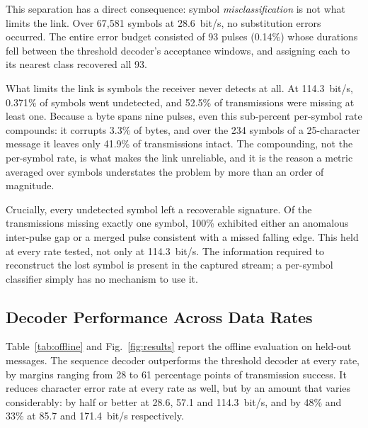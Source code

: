 This separation has a direct consequence: symbol \emph{misclassification} is not
what limits the link. Over 67{,}581 symbols at 28.6~bit/s, no substitution
errors occurred. The entire error budget consisted of 93 pulses (0.14\%) whose
durations fell between the threshold decoder's acceptance windows, and
assigning each to its nearest class recovered all 93.

What limits the link is symbols the receiver never detects at all. At
114.3~bit/s, 0.371\% of symbols went undetected, and 52.5\% of transmissions
were missing at least one. Because a byte spans nine pulses, even this
sub-percent per-symbol rate compounds: it corrupts 3.3\% of bytes, and over the
234 symbols of a 25-character message it leaves only 41.9\% of transmissions
intact. The compounding, not the per-symbol rate, is what makes the link
unreliable, and it is the reason a metric averaged over symbols understates the
problem by more than an order of magnitude.

Crucially, every undetected symbol left a recoverable signature. Of the
transmissions missing exactly one symbol, 100\% exhibited either an anomalous
inter-pulse gap or a merged pulse consistent with a missed falling edge. This
held at every rate tested, not only at 114.3~bit/s. The information required to
reconstruct the lost symbol is present in the captured stream; a per-symbol
classifier simply has no mechanism to use it.

\subsection{Decoder Performance Across Data Rates}

Table~\ref{tab:offline} and Fig.~\ref{fig:results} report the offline
evaluation on held-out messages. The sequence decoder outperforms the threshold
decoder at every rate, by margins ranging from 28 to 61 percentage points of
transmission success. It reduces character error rate at every rate as well, but by an
amount that varies considerably: by half or better at 28.6, 57.1 and
114.3~bit/s, and by 48\% and 33\% at 85.7 and 171.4~bit/s respectively.

